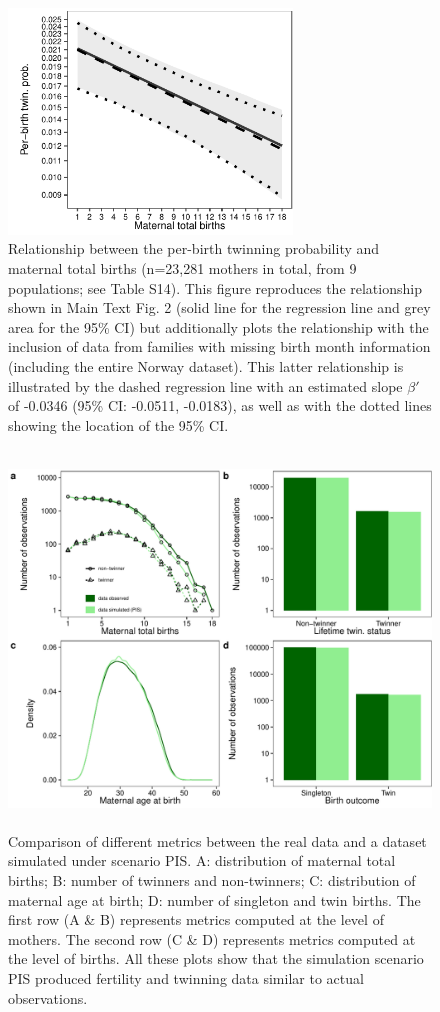 \documentclass[a4paper]{article}\usepackage[]{graphicx}\usepackage[]{color}
\begin{document}
\begin{figure}[H]
\begin{center}
\includegraphics[height = 6cm]{../figures/figS5.pdf}
\end{center}
\caption{Relationship between the per-birth twinning probability and maternal total births (n=23,281 mothers in total, from 9 populations; see Table S14). This figure reproduces the relationship shown in Main Text Fig. 2 (solid line for the regression line and grey area for the 95\% CI) but additionally plots the relationship with the inclusion of data from families with missing birth month information (including the entire Norway dataset). This latter relationship is illustrated by the dashed regression line with an estimated slope $\beta'$ of -0.0346 (95\% CI: -0.0511, -0.0183), as well as with the dotted lines showing the location of the 95\% CI.}
\end{figure}

\begin{figure}[H]
\begin{center}
\includegraphics[height = 10cm]{../figures/figS6.pdf}
\end{center}
\caption{Comparison of different metrics between the real data and a dataset simulated under scenario PIS. A: distribution of maternal total births; B: number of twinners and non-twinners; C: distribution of maternal age at birth; D: number of singleton and twin births. The first row (A \& B) represents metrics computed at the level of mothers. The second row (C \& D) represents metrics computed at the level of births. All these plots show that the simulation scenario PIS produced fertility and twinning data similar to actual observations.}
\end{figure}
\end{document}
